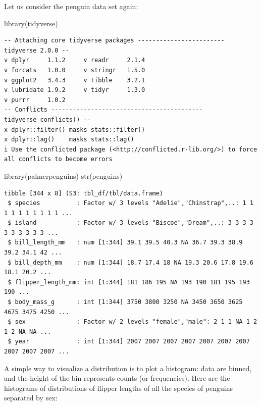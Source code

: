 \documentclass[
  letterpaper,
  DIV=11,
  numbers=noendperiod]{scrreprt}
\newenvironment{Shaded}{\begin{snugshade}}{\end{snugshade}}
\newcommand{\FunctionTok}[1]{\textcolor[rgb]{0.28,0.35,0.67}{#1}}
\newcommand{\NormalTok}[1]{\textcolor[rgb]{0.00,0.23,0.31}{#1}}
\begin{document}
Let us consider the penguin data set again:

\begin{Shaded}
\begin{Highlighting}[]
\FunctionTok{library}\NormalTok{(tidyverse)}
\end{Highlighting}
\end{Shaded}

\begin{verbatim}
-- Attaching core tidyverse packages ------------------------ tidyverse 2.0.0 --
v dplyr     1.1.2     v readr     2.1.4
v forcats   1.0.0     v stringr   1.5.0
v ggplot2   3.4.3     v tibble    3.2.1
v lubridate 1.9.2     v tidyr     1.3.0
v purrr     1.0.2     
-- Conflicts ------------------------------------------ tidyverse_conflicts() --
x dplyr::filter() masks stats::filter()
x dplyr::lag()    masks stats::lag()
i Use the conflicted package (<http://conflicted.r-lib.org/>) to force all conflicts to become errors
\end{verbatim}

\begin{Shaded}
\begin{Highlighting}[]
\FunctionTok{library}\NormalTok{(palmerpenguins)}
\FunctionTok{str}\NormalTok{(penguins)}
\end{Highlighting}
\end{Shaded}

\begin{verbatim}
tibble [344 x 8] (S3: tbl_df/tbl/data.frame)
 $ species          : Factor w/ 3 levels "Adelie","Chinstrap",..: 1 1 1 1 1 1 1 1 1 1 ...
 $ island           : Factor w/ 3 levels "Biscoe","Dream",..: 3 3 3 3 3 3 3 3 3 3 ...
 $ bill_length_mm   : num [1:344] 39.1 39.5 40.3 NA 36.7 39.3 38.9 39.2 34.1 42 ...
 $ bill_depth_mm    : num [1:344] 18.7 17.4 18 NA 19.3 20.6 17.8 19.6 18.1 20.2 ...
 $ flipper_length_mm: int [1:344] 181 186 195 NA 193 190 181 195 193 190 ...
 $ body_mass_g      : int [1:344] 3750 3800 3250 NA 3450 3650 3625 4675 3475 4250 ...
 $ sex              : Factor w/ 2 levels "female","male": 2 1 1 NA 1 2 1 2 NA NA ...
 $ year             : int [1:344] 2007 2007 2007 2007 2007 2007 2007 2007 2007 2007 ...
\end{verbatim}

A simple way to visualize a distribution is to plot a histogram: data
are binned, and the height of the bin represents counts (or
frequencies). Here are the histograms of distributions of flipper
lengths of all the species of penguins separated by sex:
\end{document}
